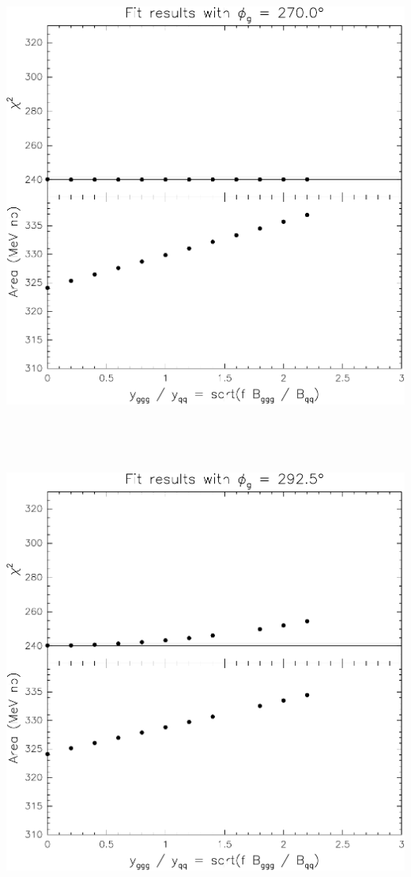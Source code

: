 \documentclass[12pt]{article}
\begin{document}
\vfill

\mbox{ }

\pagebreak

\mbox{ }

\vfill

\includegraphics[width=\linewidth]{interference-m}

\vfill

\mbox{ }

\pagebreak

\mbox{ }

\vfill

\includegraphics[width=\linewidth]{interference-n}
\end{document}
